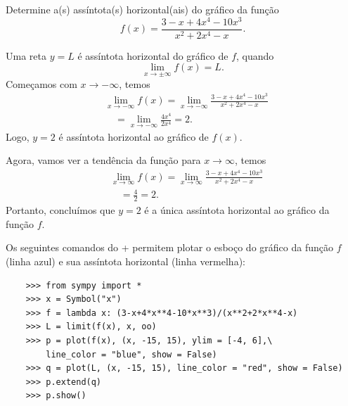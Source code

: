 \begin{exeresol}
  Determine a(s) assíntota(s) horizontal(ais) do gráfico da função
  \begin{equation}
    f(x) = \frac{3 - x + 4x^4 - 10x^3}{x^2 + 2x^4 -x}.
  \end{equation}
\end{exeresol}
\begin{resol}
  Uma reta $y = L$ é assíntota horizontal do gráfico de $f$, quando
  \begin{equation}
    \lim_{x\to\pm\infty} f(x) = L.
  \end{equation}
  Começamos com $x\to-\infty$, temos
  \begin{align}
    & \lim_{x\to-\infty} f(x) = \lim_{x\to-\infty} \frac{3 - x + 4x^4 - 10x^3}{x^2 + 2x^4 -x} \\
    & \text{}\quad = \lim_{x\to -\infty} \frac{4x^4}{2x^4} = 2.
  \end{align}
  Logo, $y=2$ é assíntota horizontal ao gráfico de $f(x)$.

  Agora, vamos ver a tendência da função para $x\to\infty$, temos
  \begin{align}
    & \lim_{x\to\infty} f(x) = \lim_{x\to\infty} \frac{3 - x + 4x^4 - 10x^3}{x^2 + 2x^4 -x} \\
    & \text{}\quad = \frac{4}{2} = 2.
  \end{align}
  Portanto, concluímos que $y=2$ é a única assíntota horizontal ao gráfico da função $f$.

  \ifispython
  Os seguintes comandos do {\python}+{\sympy} permitem plotar o esboço do gráfico da função $f$ (linha azul) e sua assíntota horizontal (linha vermelha):
  \begin{lstlisting}
    >>> from sympy import *
    >>> x = Symbol("x")
    >>> f = lambda x: (3-x+4*x**4-10*x**3)/(x**2+2*x**4-x)
    >>> L = limit(f(x), x, oo)
    >>> p = plot(f(x), (x, -15, 15), ylim = [-4, 6],\
        line_color = "blue", show = False)
    >>> q = plot(L, (x, -15, 15), line_color = "red", show = False)
    >>> p.extend(q)
    >>> p.show()
  \end{lstlisting}
  \fi
\end{resol}

